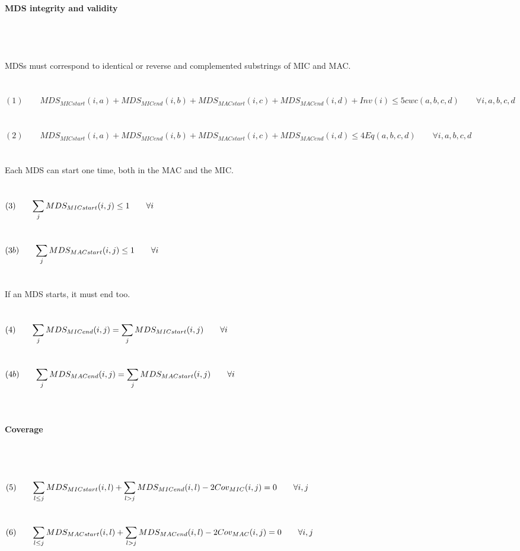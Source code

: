 \paragraph{MDS integrity and validity} $ $ \\\\\\
MDSs must correspond to identical or reverse and complemented substrings of MIC and MAC.
\\\\\\
$(1) \qquad MDS_{MICstart}(i,a) + MDS_{MICend}(i,b) + MDS_{MACstart}(i,c) + MDS_{MACend}(i,d) + Inv(i) \leq 5 cwc(a,b,c,d) \label{eq:someequation} \qquad \forall i,a,b,c,d$ \\\\\\
$(2) \qquad MDS_{MICstart}(i,a) + MDS_{MICend}(i,b) + MDS_{MACstart}(i,c) + MDS_{MACend}(i,d) \leq 4 Eq(a,b,c,d) \qquad \forall i,a,b,c,d $ \\\\\\
Each MDS can start one time, both in the MAC and the MIC. \\\\\\
$(3) \qquad \mathlarger{\sum_{j} MDS_{MICstart}(i,j)\leq 1 \qquad \forall i}$ \\\\\\
$(3b) \qquad \mathlarger{\sum_{j} MDS_{MACstart}(i,j)\leq 1 \qquad \forall i}$ \\\\\\
If an MDS starts, it must end too. \\\\\\
$(4) \qquad \mathlarger{\sum_{j} MDS_{MICend}(i,j) = \sum_{j} MDS_{MICstart}(i,j) \qquad \forall i}$ \\\\\\
$(4b) \qquad \mathlarger{\sum_{j} MDS_{MACend}(i,j) = \sum_{j} MDS_{MACstart}(i,j) \qquad \forall i}$ \\\\\\

\paragraph{Coverage} $ $
\\\\\\
$(5) \qquad \mathlarger{\sum_{l\leq j} MDS_{MICstart}(i,l) + \sum_{l>j}MDS_{MICend}(i,l) - 2Cov_{MIC}(i,j) = 0} \qquad \forall i,j $ \\\\\\
$(6) \qquad \mathlarger{\sum_{l\leq j} MDS_{MACstart}(i,l) + \sum_{l> j}MDS_{MACend}(i,l) - 2Cov_{MAC}(i,j) = 0} \qquad \forall i,j $ \\\\\\

